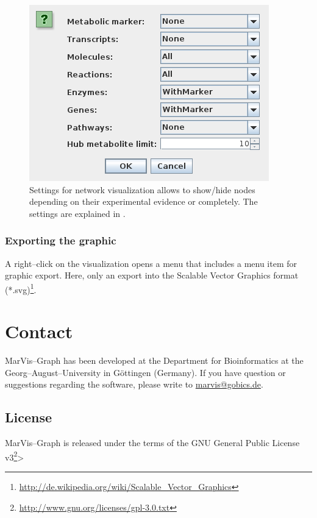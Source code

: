\documentclass[titlepage,a4paper,twoside,9pt]{article}
\newcommand{\mg}{Mar\-Vis--Graph\xspace}
\newcommand{\pref}[1]{\prettyref{#1}}
\begin{document}
\begin{figure}
	\begin{center}
		\includegraphics[scale=0.5]{images/network_visualization_types.png}
	\end{center}
	\caption[Settings for visualization]{Settings for network visualization
		allows to show/hide nodes depending on their experimental evidence or
		completely. The settings are explained in \pref{sssec:layout}.}
\end{figure}

\subsubsection{Exporting the graphic}

A right--click on the visualization opens a menu that includes a menu item for
graphic export. Here, only an export into the Scalable Vector Graphics format
(*.svg)\footnote{\url{http://de.wikipedia.org/wiki/Scalable_Vector_Graphics}}.

\section{Contact}
\mg has been developed at the Department for Bioinformatics at the
Georg--August--University in G\"ottingen (Germany).
If you have question or suggestions regarding the software, please write to
\href{mailto:marvis@gobics.de}{marvis@gobics.de}.

\subsection{License}
\mg is released under the terms of the GNU General Public License
v3\footnote{\url{http://www.gnu.org/licenses/gpl-3.0.txt}}> 
\end{document}
